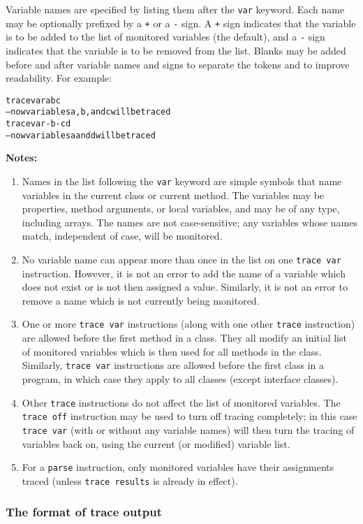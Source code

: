 Variable names are specified by listing them after the \texttt{var}
keyword.
Each name may be optionally prefixed by a \texttt{+} or a \texttt{-} sign.
A \texttt{+} sign indicates that the variable is to be added to the list
of monitored variables (the default), and a \texttt{-} sign indicates that
the variable is to be removed from the list.  Blanks may be added before
and after variable names and signs to separate the tokens and to improve
readability.
 For example:
\begin{alltt}
trace var a b c
-- now variables a, b, and c will be traced
trace var -b -c d
-- now variables a and d will be traced
\end{alltt}
 \textbf{Notes:}
\begin{enumerate}
\item 
Names in the list following the \texttt{var} keyword are simple symbols
that name variables in the current class or current method.
The variables may be properties, method arguments, or local variables,
and may be of any type, including arrays.
The names are not case-sensitive; any variables whose names match,
independent of case, will be monitored.
\item 
No variable name can appear more than once in the list on one
\texttt{trace var} instruction.  However, it is not an error to add the
name of a variable which does not exist or is not then assigned a value.
Similarly, it is not an error to remove a name which is not currently
being monitored.
\item 
One or more \texttt{trace var} instructions (along with one other
\texttt{trace} instruction) are allowed before the first method in a
class.  They all modify an initial list of monitored variables which
is then used for all methods in the class.  Similarly, \texttt{trace
var} instructions are allowed before the first class in a program,
in which case they apply to all classes (except interface classes).
\item 
Other \texttt{trace} instructions do not affect the list of monitored
variables.
The \texttt{trace off} instruction may be used to turn off tracing
completely; in this case \texttt{trace var} (with or without any
variable names) will then turn the tracing of variables back on, using
the current (or modified) variable list.
\item 
For a \texttt{parse} instruction, only monitored variables have their
assignments traced (unless \texttt{trace results} is already in effect).
\end{enumerate}
\subsubsection{The format of trace output}
 
